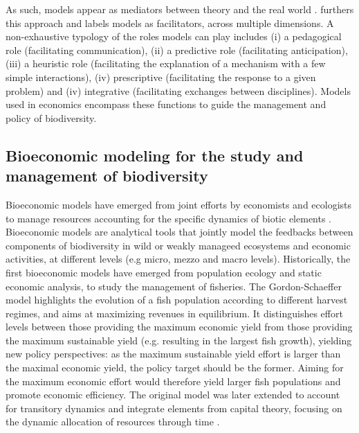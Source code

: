 As such, models appear as mediators between theory and the real world \citep{morgan_models_2009}. \cite{varenne_epistemologie_2014} furthers this approach and labels models as facilitators, across multiple dimensions. A non-exhaustive typology of the roles models can play includes (i) a pedagogical role (facilitating communication), (ii) a predictive role (facilitating anticipation), (iii) a heuristic role (facilitating the explanation of a mechanism with a few simple interactions), (iv) prescriptive (facilitating the response to a given problem) and (iv) integrative (facilitating exchanges between disciplines). Models used in economics encompass these functions to guide the management and policy of biodiversity. 


\subsection*{Bioeconomic modeling for the study and management of biodiversity}

Bioeconomic models \citep{Gordon1954, smith_models_1969, clark_profit_1973} have emerged from joint efforts by economists and ecologists to manage resources accounting for the specific dynamics of biotic elements \citep{Parent_Mouysset_Missemer_Levrel_2024}. Bioeconomic models are analytical tools that jointly model the feedbacks between components of biodiversity in wild or weakly manageed ecosystems and economic activities, at different levels (e.g micro, mezzo and macro levels). 
Historically, the first bioeconomic models have emerged from population ecology and static economic analysis, to study the management of fisheries. The Gordon-Schaeffer model highlights the evolution of a fish population according to different harvest regimes, and aims at maximizing revenues in equilibrium. It distinguishes effort levels between those providing the maximum economic yield from those providing the maximum sustainable yield (e.g. resulting in the largest fish growth), yielding new policy perspectives: as the maximum sustainable yield effort is larger than the maximal economic yield, the policy target should be the former. Aiming for the maximum economic effort would therefore yield larger fish populations and promote economic efficiency. The original model was later extended to account for transitory dynamics and integrate elements from capital theory, focusing on the dynamic allocation of resources through time \citep{smith_models_1969, clark_profit_1973}. 

